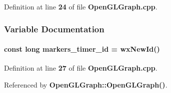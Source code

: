 Definition at line {\bf 24} of file {\bf Open\+G\+L\+Graph.\+cpp}.



\subsubsection{Variable Documentation}
\paragraph[{markers\+\_\+timer\+\_\+id}]{\setlength{\rightskip}{0pt plus 5cm}const long markers\+\_\+timer\+\_\+id = wx\+New\+Id()}\label{OpenGLGraph_8cpp_a37906e0670001f1cb6a7e5b2e7bdb849}


Definition at line {\bf 27} of file {\bf Open\+G\+L\+Graph.\+cpp}.



Referenced by {\bf Open\+G\+L\+Graph\+::\+Open\+G\+L\+Graph()}.

